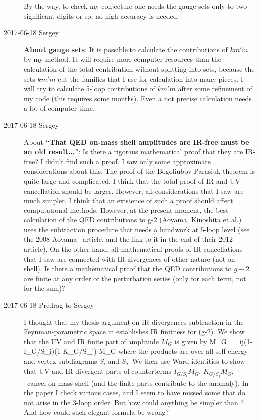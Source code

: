 \begin{description}
By the way, to check my conjecture one needs the gauge sets only to two
significant digits or so, no high accuracy is needed.

\item[2017-06-18 Sergey]
\textbf{About gauge sets}:
It is possible to calculate the contributions of $km'm$ by my
method. It will require more computer resources than the calculation of
the total contribution without splitting into sets, because the sets
$km'm$ cut the families that I use for calculation into many pieces.
I will try to calculate 5-loop contributions of $km'm$ after
some refinement of my code (this requires some months). Even a not
precise calculation needs a lot of computer time.

\item[2017-06-18 Sergey] About
\textbf{``That QED on-mass shell amplitudes are IR-free must be an old result..."}:
Is there a rigorous mathematical proof that they are IR-free? I didn't
find such a proof. I saw only some approximate considerations about this.
The proof of the Bogoliubov-Parasiuk theorem is quite large and
complicated. I think that the total proof of IR and UV cancellation
should be larger. However, all considerations that I saw are much
simpler. I think that an existence of such a proof should affect
computational methods. However, at the present moment, the best
calculation of the QED contributions to g-2 (Aoyama, Kinoshita et al.)
uses the subtraction procedure that needs a handwork at 5-loop level (see
the 2008 Aoyama \etal\ article, and the link to it in
the end of their 2012 article). On the other hand, all
mathematical proofs of IR cancellations that I saw are connected with IR
divergences of other nature (not on-shell). Is there a mathematical proof
that the QED contributions to $g-2$ are finite at any order of the
perturbation series (only for each term, not for the sum)?

\item[2017-06-18 Predrag to Sergey]
I thought that my thesis argument on IR divergences subtraction in the
Feynman-parametric space in  establishes IR finitness for
(g-2).
We show that the UV and IR finite part of amplitude $M_G$ is given by
\beq
\Delta M_G =\prod_{ij}(1-I_{G/S_i})(1-K_{G/S_j}) M_G
where the products are over all self-energy and vertex subdiagrams $S_i$
and $S_j$. We then use Ward identities to show that UV and IR
divergent parts of counterterms $I_{G/S_i} M_G$, $K_{G/S_j} M_G$, \etc\
cancel on mass shell (and the finite parts contribute to the anomaly). In
the paper I check various cases, and I seem to have missed some that do
not arise in the 3-loop order. But how could anything be simpler than
\refeq{UV-IRfiniteGcorr}? And how could such elegant formula be wrong?


\end{description}
